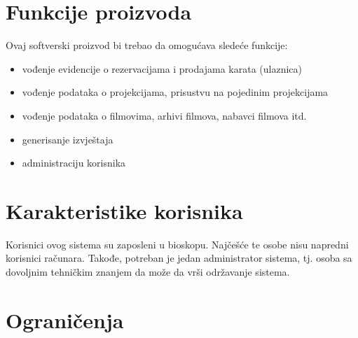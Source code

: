 \section{Funkcije proizvoda}
Ovaj softverski proizvod bi trebao da omogućava sledeće funkcije:
\begin{itemize}
  \item vođenje evidencije o rezervacijama i prodajama karata (ulaznica)
  \item vođenje podataka o projekcijama, prisustvu na pojedinim projekcijama
  \item vođenje podataka o filmovima, arhivi filmova, nabavci filmova itd.
  \item generisanje  izvještaja
  \item administraciju korisnika  
\end{itemize}

\section{Karakteristike korisnika}

Korisnici ovog sistema su zaposleni u bioskopu. Najčešće te osobe nisu napredni korisnici računara. Takođe, potreban je jedan administrator sistema, tj. osoba sa dovoljnim tehničkim znanjem da može da vrši održavanje sistema.


\section{Ograničenja}


